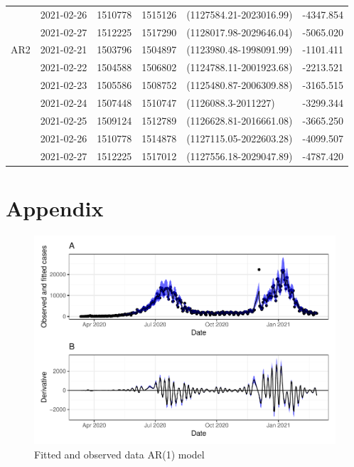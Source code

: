 \documentclass[10pt,letterpaper]{article}
\begin{document}
\begin{table}[!h]
\begin{tabular}[t]{l|l|r|r|l|r}
&2021-02-26 & 1510778 & 1515126 & (1127584.21-2023016.99) & -4347.854\\
&2021-02-27 & 1512225 & 1517290 & (1128017.98-2029646.04) & -5065.020\\
\hline
AR2&2021-02-21 & 1503796 & 1504897 & (1123980.48-1998091.99) & -1101.411\\
&2021-02-22 & 1504588 & 1506802 & (1124788.11-2001923.68) & -2213.521\\
&2021-02-23 & 1505586 & 1508752 & (1125480.87-2006309.88) & -3165.515\\
&2021-02-24 & 1507448 & 1510747 & (1126088.3-2011227) & -3299.344\\
&2021-02-25 & 1509124 & 1512789 & (1126628.81-2016661.08) & -3665.250\\
&2021-02-26 & 1510778 & 1514878 & (1127115.05-2022603.28) & -4099.507\\
&2021-02-27 & 1512225 & 1517012 & (1127556.18-2029047.89) & -4787.420\\
\hline
\end{tabular}
\end{table}









\newpage

\hypertarget{appendix}{%
\section{Appendix}\label{appendix}}

\setcounter{table}{0} \renewcommand{\thetable}{S\arabic{table}} \setcounter{figure}{0} \renewcommand{\thefigure}{S\arabic{figure}}

\begin{figure}[H]
	\includegraphics[width=0.99\linewidth]{COVIDincidenceSA_files/figure-latex/unnamed-chunk-6-1} \caption{Fitted and observed data AR(1) model}\label{fig:unnamed-chunk-6}
\end{figure}
\end{document}
